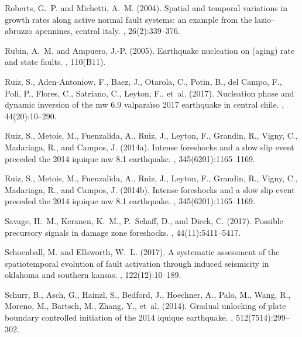 \documentclass[a4paper,12pt,twoside]{article}
\begin{document}
\begin{thebibliography}{}
Roberts, G.~P. and Michetti, A.~M. (2004).
\newblock Spatial and temporal variations in growth rates along active normal
  fault systems: an example from the lazio--abruzzo apennines, central italy.
, 26(2):339--376.

Rubin, A.~M. and Ampuero, J.-P. (2005).
\newblock Earthquake nucleation on (aging) rate and state faults.
, 110(B11).

Ruiz, S., Aden-Antoniow, F., Baez, J., Otarola, C., Potin, B., del Campo, F.,
  Poli, P., Flores, C., Satriano, C., Leyton, F., et~al. (2017).
\newblock Nucleation phase and dynamic inversion of the mw 6.9 valpara{\'\i}so
  2017 earthquake in central chile.
, 44(20):10--290.

Ruiz, S., Metois, M., Fuenzalida, A., Ruiz, J., Leyton, F., Grandin, R., Vigny,
  C., Madariaga, R., and Campos, J. (2014a).
\newblock Intense foreshocks and a slow slip event preceded the 2014 iquique mw
  8.1 earthquake.
, 345(6201):1165--1169.

Ruiz, S., Metois, M., Fuenzalida, A., Ruiz, J., Leyton, F., Grandin, R., Vigny,
  C., Madariaga, R., and Campos, J. (2014b).
\newblock Intense foreshocks and a slow slip event preceded the 2014 iquique mw
  8.1 earthquake.
, 345(6201):1165--1169.

Savage, H.~M., Keranen, K.~M., P.~Schaff, D., and Dieck, C. (2017).
\newblock Possible precursory signals in damage zone foreshocks.
, 44(11):5411--5417.

Schoenball, M. and Ellsworth, W.~L. (2017).
\newblock A systematic assessment of the spatiotemporal evolution of fault
  activation through induced seismicity in oklahoma and southern kansas.
, 122(12):10--189.

Schurr, B., Asch, G., Hainzl, S., Bedford, J., Hoechner, A., Palo, M., Wang,
  R., Moreno, M., Bartsch, M., Zhang, Y., et~al. (2014).
\newblock Gradual unlocking of plate boundary controlled initiation of the 2014
  iquique earthquake.
, 512(7514):299--302.


\end{thebibliography}
\end{document}
